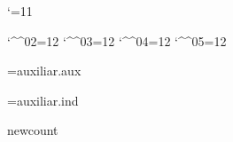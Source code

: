 
\ifx\utfon\undefined  \fi

\catcode`\@=11

\catcode`\^^02=12 \catcode`\^^03=12 \catcode`\^^04=12 \catcode`\^^05=12


\newread\infile

\newif\ifauxf
\openin\infile=auxiliar.aux
\ifeof\infile \auxffalse \else \auxftrue \fi
\closein\infile

\newif\ifindf
\openin\infile=auxiliar.ind
\ifeof\infile \indffalse \else \indftrue \fi
\closein\infile


\ifx\pdfoutput\undefined \csname newcount\endcsname\pdfoutput \fi


\def\cmykWhite{0 0 0 0} \def\cmykDarkWhite{0 0 0 .3}
\def\cmykGray{0 0 0 .5} \def\cmykDarkGray{0 0 0 .7}
\def\cmykBlack{0 0 0 1} \def\cmykDarkBlack{.4 .3 .3 1}
\def\cmykYellow{0 0 1 0} \def\cmykDarkYellow{0 0 1 .7}
\def\cmykMagenta{0 1 0 0} \def\cmykDarkMagenta{0 1 0 .7}
\def\cmykCyan{1 0 0 0} \def\cmykDarkCyan{1 0 0 .7}
\def\cmykRed{0 1 1 0} \def\cmykDarkRed{0 1 1 .7}
\def\cmykGreen{1 0 1 0} \def\cmykDarkGreen{1 0 1 .7}
\def\cmykBlue{1 1 0 0} \def\cmykDarkBlue{1 1 0 .7}

\newcount\col@rstack
\def\pdf@color#1{\pdfcolorstack\col@rstack push {\csname cmyk#1\endcsname k}}
 \def\pdf@darkcolor#1{\pdfcolorstack\col@rstack push {\csname cmykDark#1\endcsname k}}
 \def\pdf@endcolor{\pdfcolorstack\col@rstack pop}
 \def\pdf@black{\pdfcolorstack\col@rstack push {0 g}}
\def\dvips@color#1{\special{color push cmyk \csname cmyk#1\endcsname}}
 \def\dvips@darkcolor#1{\special{color push cmyk \csname cmykDark#1\endcsname}}
 \def\dvips@endcolor{\special{color pop}}
 \def\dvips@black{\special{color push gray 0}}
\def\dvipdf@color#1{\special{pdf: bc [\csname cmyk#1\endcsname]}}
 \def\dvipdf@darkcolor#1{\special{pdf: bc [\csname cmykDark#1\endcsname]}}
 \def\dvipdf@endcolor{\special{pdf: ec}}
 \def\dvipdf@black{\special{pdf: bc [0]}}

\def\pdf@background#1{\pdf@color{#1}%
 \pdfliteral page {q 0 0 m 595 0 l 595 842 l 0 842 l h f Q}\pdf@endcolor}
\def\dvips@background#1{\dvips@color{#1}\special{gsave
 0 0 moveto 800 0 lineto 800 400 lineto 0 400 lineto closepath fill grestore}\dvips@endcolor}
\def\dvipdf@background#1{\special{pdf: bgc [\csname cmyk#1\endcsname]}}

